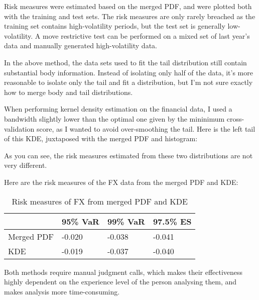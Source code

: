\documentclass{article}
\newcommand{\ciapdf}[1]{\resizebox{\textwidth}{!}{\texttt{[image: \#1]}}}
\begin{document}
\ciapdf{assignment_1/report_pic/MergedPdf.pdf}
\ciapdf{assignment_1/report_pic/OneMergingPoint.pdf}

Risk measures were estimated based on the merged PDF, and were plotted both
with the training and test sets. The risk measures are only rarely breached as
the training set contains high-volatility periods, but the test set is
generally low-volatility. A move restrictive test can be performed on a mixed
set of last year's data and manually generated high-volatility data.

\ciapdf{assignment_1/report_pic/MergedRiskMeasure.pdf}

In the above method, the data sets used to fit the tail distribution still
contain substantial body information. Instead of isolating only half of the
data, it's more reasonable to isolate only the tail and fit a distribution, but
I'm not sure exactly how to merge body and tail distributions.

When performing kernel density estimation on the financial data, I used a
bandwidth slightly lower than the optimal one given by the mininimum
cross-validation score, as I wanted to avoid over-smoothing the tail. Here is
the left tail of this KDE, juxtaposed with the merged PDF and histogram:

\ciapdf{assignment_1/report_pic/KDEVSMerged.pdf}

As you can see, the risk measures estimated from these two distributions are
not very different.

\ciapdf{assignment_1/report_pic/KDEvsMergedRisk.pdf}

Here are the risk measures of the FX data from the merged PDF and KDE:

\begin{table}[H]
    \centering
    \caption{Risk measures of FX from merged PDF and KDE}
    \begin{tabular}{|l|l|l|l|}
    \hline
               & 95\% VaR & 99\% VaR & 97.5\% ES \\ \hline
    Merged PDF & -0.020   & -0.038   & -0.041    \\ \hline
    KDE        & -0.019   & -0.037   & -0.040    \\ \hline
    \end{tabular}
\end{table}

Both methods require manual judgment calls, which makes their effectiveness
highly dependent on the experience level of the person analysing them, and
makes analysis more time-consuming.
\end{document}
